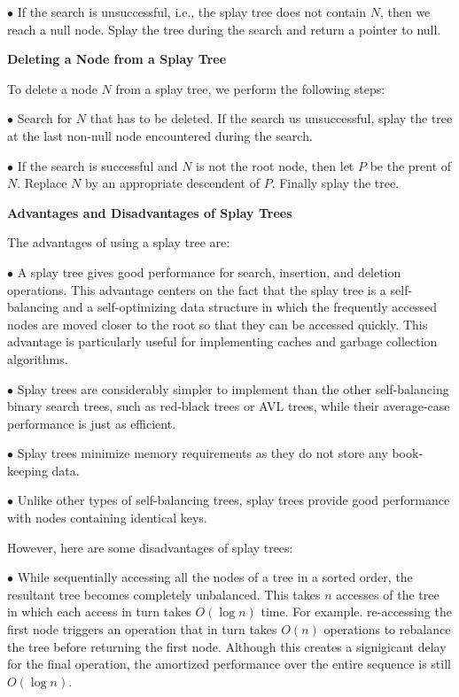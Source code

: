 \vskip 3mm
\qquad$\bullet$ If the search is unsuccessful, i.e., the splay tree does not contain $N$, then we reach a null node. Splay the tree during the search and return a pointer to null.


\vskip 3mm
{\bf Deleting a Node from a Splay Tree}

\vskip 1mm
To delete a node $N$ from a splay tree, we perform the following steps:

\vskip 2mm
\qquad$\bullet$ Search for $N$ that has to be deleted. If the search us unsuccessful, splay the tree at the last non-null node encountered during the search.

\vskip 3mm
\qquad$\bullet$ If the search is successful and $N$ is not the root node, then let $P$ be the prent of $N$. Replace $N$ by an appropriate descendent of $P$. Finally splay the tree.

\vskip 3mm
{\bf Advantages and Disadvantages of Splay Trees}

\vskip 1mm
The advantages of using a splay tree are:

\vskip 2mm
\qquad$\bullet$ A splay tree gives good performance for search, insertion, and deletion operations. This advantage centers on the fact that the splay tree is a self-balancing and a self-optimizing data structure in which the frequently accessed nodes are moved closer to the root so that they can be accessed quickly. This advantage is particularly useful for implementing caches and garbage collection algorithms.

\vskip 3mm
\qquad$\bullet$ Splay trees are considerably simpler to implement than the other self-balancing binary search trees, such as red-black trees or AVL trees, while their average-case performance is just as efficient.

\vskip 3mm
\qquad$\bullet$ Splay trees minimize memory requirements as they do not store any book-keeping data.

\vskip 3mm
\qquad$\bullet$ Unlike other types of self-balancing trees, splay trees provide good performance with nodes containing identical keys.

\vskip 3mm
However, here are some disadvantages of splay trees:

\vskip 3mm
\qquad$\bullet$ While sequentially accessing all the nodes of a tree in a sorted order, the resultant tree becomes completely unbalanced. This takes $n$ accesses of the tree in which each access in turn takes  $O(\log n)$ time. For example. re-accessing the first node triggers an operation that in turn takes $O(n)$ operations to rebalance the tree before returning the first node. Although this creates a signigicant delay for the final operation, the amortized performance over the entire sequence is still $O(\log n)$.

